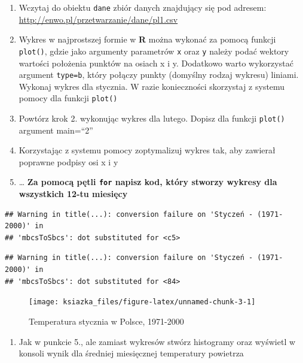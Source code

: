 \documentclass[]{book}
\providecommand{\tightlist}{%
  \setlength{\itemsep}{0pt}\setlength{\parskip}{0pt}}
\theoremstyle{definition}
\theoremstyle{definition}
\theoremstyle{definition}
\theoremstyle{remark}
\begin{document}
\begin{enumerate}
\def\labelenumi{\arabic{enumi}.}
\tightlist
\item
  Wczytaj do obiektu \texttt{dane} zbiór danych znajdujący się pod
  adresem: \url{http://enwo.pl/przetwarzanie/dane/pl1.csv}
\item
  Wykres w najprostszej formie w \textbf{R} można wykonać za pomocą
  funkcji \texttt{plot()}, gdzie jako argumenty parametrów \texttt{x}
  oraz \texttt{y} należy podać wektory wartości położenia punktów na
  osiach x i y. Dodatkowo warto wykorzystać argument
  \texttt{type=\textquotesingle{}b\textquotesingle{}}, który połączy
  punkty (domyślny rodzaj wykresu) liniami. Wykonaj wykres dla stycznia.
  W razie konieczności skorzystaj z systemu pomocy dla funkcji
  \texttt{plot()}
\item
  Powtórz krok 2. wykonując wykres dla lutego. Dopisz dla funkcji
  \texttt{plot()} argument main=``2''
\item
  Korzystając z systemu pomocy zoptymalizuj wykres tak, aby zawierał
  poprawne podpisy osi x i y
\item
  \ldots{} \textbf{Za pomocą pętli \texttt{for} napisz kod, który
  stworzy wykresy dla wszystkich 12-tu miesięcy}
\end{enumerate}

\begin{verbatim}
## Warning in title(...): conversion failure on 'Styczeń - (1971-2000)' in
## 'mbcsToSbcs': dot substituted for <c5>
\end{verbatim}

\begin{verbatim}
## Warning in title(...): conversion failure on 'Styczeń - (1971-2000)' in
## 'mbcsToSbcs': dot substituted for <84>
\end{verbatim}

\begin{figure}

{\centering \texttt{[image: ksiazka\_files/figure-latex/unnamed-chunk-3-1]} 

}

\caption{Temperatura stycznia w Polsce, 1971-2000}\label{fig:unnamed-chunk-3}
\end{figure}

\begin{enumerate}
\def\labelenumi{\arabic{enumi}.}
\setcounter{enumi}{5}
\tightlist
\item
  Jak w punkcie 5., ale zamiast wykresów stwórz histogramy oraz wyświetl
  w konsoli wynik dla średniej miesięcznej temperatury powietrza
\end{enumerate}
\end{document}
